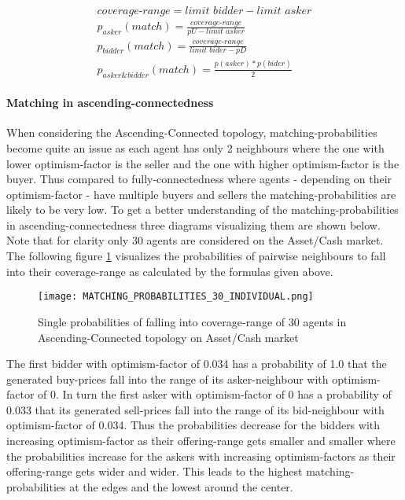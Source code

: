 \documentclass[Bachelorarbeit.tex]{subfiles}
\begin{document}
\begin{equation}
\begin{split}
\textit{coverage-range} = \textit{limit bidder} - \textit{limit asker} \\
p_{asker}(match) = \frac{\textit{coverage-range}}{ pU - \textit{limit asker} } \\
p_{bidder}(match) = \frac{\textit{coverage-range}}{ \textit{limit bider} - pD } \\
p_{asker\&bidder}(match) = \frac{p(asker) * p(bider)}{2}
\end{split}
\end{equation}

\paragraph{Matching in ascending-connectedness}
When considering the Ascending-Connected topology, matching-probabilities become quite an issue as each agent has only 2 neighbours where the one with lower optimism-factor is the seller and the one with higher optimism-factor is the buyer. Thus compared to fully-connectedness where agents - depending on their optimism-factor - have multiple buyers and sellers the matching-probabilities are likely to be very low. To get a better understanding of the matching-probabilities in ascending-connectedness three diagrams visualizing them are shown below. Note that for clarity only 30 agents are considered on the Asset/Cash market.
\medskip
The following figure \ref{fig:MATCHING_PROBABILITIES_30_INDIVIDUAL} visualizes the probabilities of pairwise neighbours to fall into their coverage-range as calculated by the formulas given above.

\begin{figure}[H]
	\centering
  \texttt{[image: MATCHING\_PROBABILITIES\_30\_INDIVIDUAL.png]}
	\caption{Single probabilities of falling into coverage-range of 30 agents in Ascending-Connected topology on Asset/Cash market}
	\label{fig:MATCHING_PROBABILITIES_30_INDIVIDUAL}
\end{figure}

The first bidder with optimism-factor of 0.034 has a probability of 1.0 that the generated buy-prices fall into the range of its asker-neighbour with optimism-factor of 0. In turn the first asker with optimism-factor of 0 has a probability of 0.033 that its generated sell-prices fall into the range of its bid-neighbour with optimism-factor of 0.034. Thus the probabilities decrease for the bidders with increasing optimism-factor as their offering-range gets smaller and smaller where the probabilities increase for the askers with increasing optimism-factors as their offering-range gets wider and wider. This leads to the highest matching-probabilities at the edges and the lowest around the center.
\end{document}
